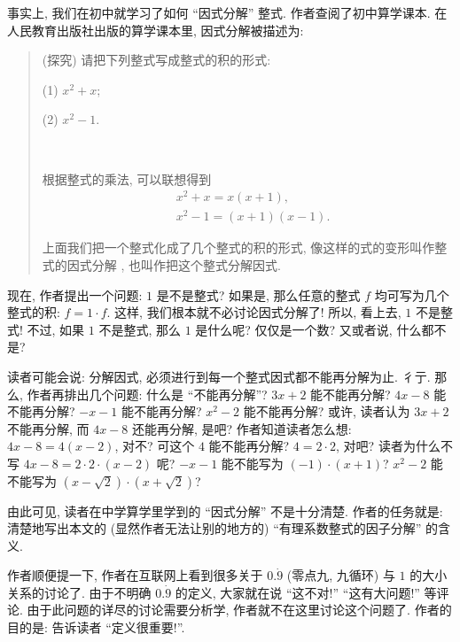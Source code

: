 \begin{example}
    事实上, 我们在初中就学习了如何 ``因式分解'' 整式. 作者查阅了初中算学课本. 在人民教育出版社出版的算学课本里, 因式分解被描述为:
    \begin{quotation}
        (探究) 请把下列整式写成整式的积的形式:

        (1) $x^2 + x$;

        (2) $x^2 - 1$.

        ~\

        根据整式的乘法, 可以联想得到
        \begin{align*}
             & x^2 + x = x(x+1),         \\
             & x^2 - 1 = (x + 1)(x - 1).
        \end{align*}

        上面我们把一个整式化成了几个整式的积的形式, 像这样的式的变形叫作整式的因式分解 , 也叫作把这个整式分解因式.
    \end{quotation}

    现在, 作者提出一个问题: $1$ 是不是整式? 如果是, 那么任意的整式 $f$ 均可写为几个整式的积: $f = 1 \cdot f$. 这样, 我们根本就不必讨论因式分解了! 所以, 看上去, $1$ 不是整式! 不过, 如果 $1$ 不是整式, 那么 $1$ 是什么呢? 仅仅是一个数? 又或者说, 什么都不是?

    读者可能会说: 分解因式, 必须进行到每一个整式因式都不能再分解为止. 彳亍. 那么, 作者再排出几个问题: 什么是 ``不能再分解''? $3x + 2$ 能不能再分解? $4x - 8$ 能不能再分解? $-x - 1$ 能不能再分解? $x^2 - 2$ 能不能再分解? 或许, 读者认为 $3x + 2$ 不能再分解, 而 $4x - 8$ 还能再分解, 是吧? 作者知道读者怎么想: $4x - 8 = 4(x - 2)$, 对不? 可这个 $4$ 能不能再分解? $4 = 2 \cdot 2$, 对吧? 读者为什么不写 $4x - 8 = 2 \cdot 2 \cdot (x-2)$ 呢? $-x - 1$ 能不能写为 $(-1) \cdot (x+1)$? $x^2 - 2$ 能不能写为 $(x - \sqrt{2}) \cdot (x + \sqrt{2})$?

    由此可见, 读者在中学算学里学到的 ``因式分解'' 不是十分清楚. 作者的任务就是: 清楚地写出本文的 (显然作者无法让别的地方的) ``有理系数整式的因子分解'' 的含义.

    作者顺便提一下, 作者在互联网上看到很多关于 $0.\dot{9}$ (零点九, 九循环) 与 $1$ 的大小关系的讨论了. 由于不明确 $0.\dot{9}$ 的定义, 大家就在说 ``这不对!'' ``这有大问题!'' 等评论. 由于此问题的详尽的讨论需要分析学, 作者就不在这里讨论这个问题了. 作者的目的是: 告诉读者 ``定义很重要!''.
\end{example}

